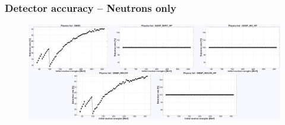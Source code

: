 \begin{frame}
\frametitle{Detector accuracy -- Neutrons only}

\begin{figure}
	\includegraphics[width=\textwidth]{images/detection_rates_neutron_only.pdf}
\end{figure}


\end{frame}